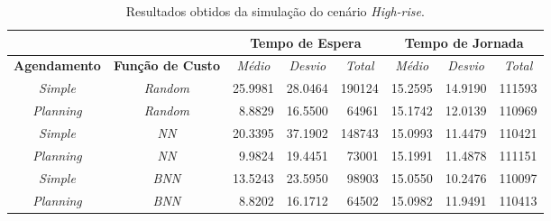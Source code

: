 \begin{table}[htb!]
\centering
\caption{Resultados obtidos da simulação do cenário \textit{High-rise}.}
\label{tab:results:highrise}
\begin{tabular}{|c|c|r|r|r|r|r|r|}
\hline
\multicolumn{2}{|c|}{\textbf{}}                 & \multicolumn{3}{c|}{\textbf{Tempo de Espera}}                                                                    & \multicolumn{3}{c|}{\textbf{Tempo de Jornada}}                                                                                                                       \\ \hline
\textbf{Agendamento} & \textbf{Função de Custo} & \multicolumn{1}{c|}{\textit{Médio}} & \multicolumn{1}{c|}{\textit{Desvio}} & \multicolumn{1}{c|}{\textit{Total}} & \multicolumn{1}{c|}{\textit{Médio}}                   & \multicolumn{1}{c|}{\textit{Desvio}}                  & \multicolumn{1}{c|}{\textit{Total}}                  \\ \hline
\textit{Simple}      & \textit{Random}          & 25.9981                         & 28.0464                         & 190124                          & 15.2595                         & 14.9190                         & 111593                          \\ \hline
\textit{Planning}    & \textit{Random}          &  8.8829                         & 16.5500                         &  64961                          & 15.1742                         & 12.0139                         & 110969                          \\ \hline
\textit{Simple}      & \textit{NN}              & 20.3395                         & 37.1902                         & 148743                          & 15.0993                         & 11.4479                         & 110421                          \\ \hline
\textit{Planning}    & \textit{NN}              &  9.9824                         & 19.4451                         &  73001                          & 15.1991                         & 11.4878                         & 111151                          \\ \hline
\textit{Simple}      & \textit{BNN}             & 13.5243                         & 23.5950                         &  98903                          & 15.0550                         & \cellcolor[HTML]{67FD9A}10.2476 & 110097                          \\ \hline
\textit{Planning}    & \textit{BNN}             & \cellcolor[HTML]{67FD9A} 8.8202 & \cellcolor[HTML]{67FD9A}16.1712 & \cellcolor[HTML]{67FD9A} 64502  & 15.0982                         & 11.9491                         & 110413                          \\ \hline

\end{tabular}
\end{table}
